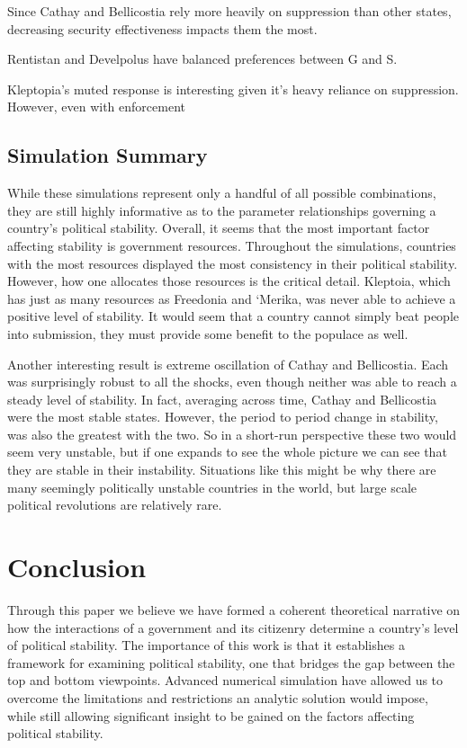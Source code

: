 \documentclass[12pt]{article}
\begin{document}
\begin{spacing}{1.5}
Since Cathay and Bellicostia rely more heavily on suppression than other states, decreasing security effectiveness impacts them the most.    



Rentistan and Develpolus have balanced preferences between G and S. 

Kleptopia's muted response is interesting given it's heavy reliance on suppression. However, even with enforcement  





\subsection{Simulation Summary} 

While these simulations represent only a handful of all possible combinations, they are still highly informative as to the parameter relationships governing a country's political stability. Overall, it seems that the most important factor affecting stability is government resources. Throughout the simulations, countries with the most resources displayed the most consistency in their political stability. However, how one allocates those resources is the critical detail. Kleptoia, which has just as many resources as Freedonia and `Merika, was never able to achieve a positive level of stability. It would seem that a country cannot simply beat people into submission, they must provide some benefit to the populace as well. 

Another interesting result is extreme oscillation of Cathay and Bellicostia. Each was surprisingly robust to all the shocks, even though neither was able to reach a steady level of stability. In fact, averaging across time, Cathay and Bellicostia were the most stable states. However, the period to period change in stability, was also the greatest with the two. So in a short-run perspective these two would seem very unstable, but if one expands to see the whole picture we can see that they are stable in their instability. Situations like this might be why there are many seemingly politically unstable countries in the world, but large scale political revolutions are relatively rare.   

\section{Conclusion}

Through this paper we believe we have formed a coherent theoretical narrative on how the interactions of a government and its citizenry determine a country's level of political stability. The importance of this work is that it establishes a framework for examining political stability, one that bridges the gap between the top and bottom viewpoints. Advanced numerical simulation have allowed us to overcome the limitations and restrictions an analytic solution would impose, while still allowing significant insight to be gained on the factors affecting political stability. 
 

\end{spacing}
\end{document}
